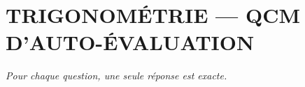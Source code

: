 
\section*{\textcolor{chapcolor}{\MakeUppercase{Trigonométrie — QCM d'auto-évaluation}}}

\begin{center}
\textit{Pour chaque question, une seule réponse est exacte.}
\end{center}

